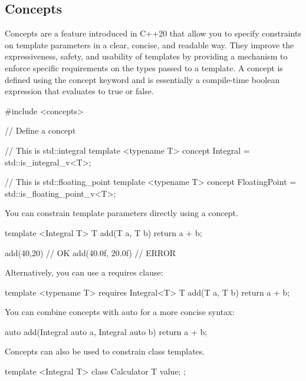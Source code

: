 \documentclass{report}
\begin{document}
    \pagebreak 
    \subsection{Concepts}
    \bigbreak \noindent 
    Concepts are a feature introduced in C++20 that allow you to specify constraints on template parameters in a clear, concise, and readable way. They improve the expressiveness, safety, and usability of templates by providing a mechanism to enforce specific requirements on the types passed to a template.
    \bigbreak \noindent 
    A concept is defined using the concept keyword and is essentially a compile-time boolean expression that evaluates to true or false.
    \bigbreak \noindent 
    \begin{cppcode}
        #include <concepts>

        // Define a concept

        // This is std::integral
        template <typename T>
        concept Integral = std::is_integral_v<T>;

        // This is std::floating_point
        template <typename T>
        concept FloatingPoint = std::is_floating_point_v<T>;
    \end{cppcode}
    \bigbreak \noindent 
    You can constrain template parameters directly using a concept.
    \bigbreak \noindent 
    \begin{cppcode}
        template <Integral T>
        T add(T a, T b) {
            return a + b;
        }

        add(40,20) // OK
        add(40.0f, 20.0f) // ERROR
    \end{cppcode}
    \bigbreak \noindent 
    Alternatively, you can use a requires clause:
    \bigbreak \noindent 
    \begin{cppcode}
        template <typename T>
        requires Integral<T>
        T add(T a, T b) {
            return a + b;
        }
    \end{cppcode}
    \bigbreak \noindent 
    You can combine concepts with auto for a more concise syntax:
    \bigbreak \noindent 
    \begin{cppcode}
        auto add(Integral auto a, Integral auto b) {
            return a + b;
        }
    \end{cppcode}
    \bigbreak \noindent 
    Concepts can also be used to constrain class templates.
    \bigbreak \noindent 
    \begin{cppcode}
        template <Integral T>
        class Calculator {
            T value;
        };
    \end{cppcode}
\end{document}
